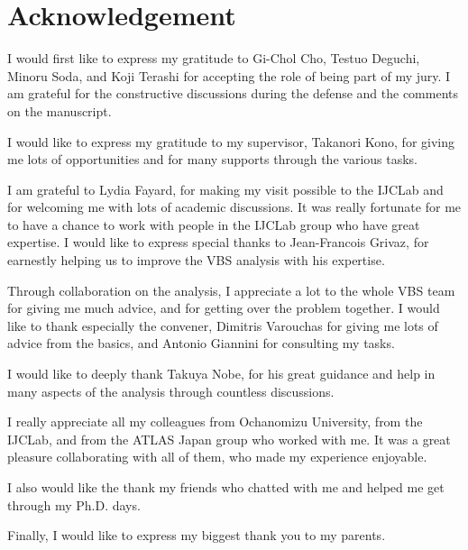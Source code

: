 \chapter*{Acknowledgement}

I would first like to express my gratitude to Gi-Chol Cho, Testuo Deguchi, Minoru Soda, and Koji Terashi for accepting the role of being part of my jury. 
I am grateful for the constructive discussions during the defense and the comments on the manuscript.

I would like to express my gratitude to my supervisor, Takanori Kono, for giving me lots of opportunities and for many supports through the various tasks.

I am grateful to Lydia Fayard, for making my visit possible to the IJCLab and for welcoming me with lots of academic discussions. It was really fortunate for me to have a chance to work with people in the IJCLab group who have great expertise. I would like to express special thanks to Jean-Francois Grivaz, for earnestly helping us to improve the VBS analysis with his expertise.  

Through collaboration on the analysis, I appreciate a lot to the whole VBS team for giving me much advice, and for getting over the problem together. I would like to thank especially the convener, Dimitris Varouchas for giving me lots of advice from the basics, and Antonio Giannini for consulting my tasks.

I would like to deeply thank Takuya Nobe, for his great guidance and help in many aspects of the analysis through countless discussions.

I really appreciate all my colleagues from Ochanomizu University, from the IJCLab,  and from the ATLAS Japan group who worked with me.
It was a great pleasure collaborating with all of them, who made my experience enjoyable. 

I also would like the thank my friends who chatted with me and helped me get through my Ph.D. days.

Finally, I would like to express my biggest thank you to my parents.

  

